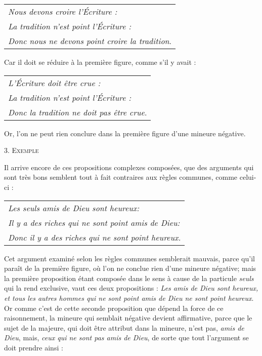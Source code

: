 	\begin{tabularx}{\textwidth}{X}
		\emph{Nous devons croire l'Écriture :} \\
		\emph{La tradition n'est point l'Écriture :} \\
		\emph{Donc nous ne devons point croire la tradition}. \\
	\end{tabularx}

Car il doit se réduire à la première figure, comme s'il y avait :

	\begin{tabularx}{\textwidth}{X}
		\emph{L'Écriture doit être crue :} \\
		\emph{La tradition n'est point l'Écriture :} \\
		\emph{Donc la tradition ne doit pas être crue}. \\
	\end{tabularx}

Or, l'on ne peut rien conclure dans la première figure d'une mineure négative.

\begin{center}{\scshape 3. Exemple}\end{center}

Il arrive encore de ces propositions complexes composées, que des arguments qui sont très bons semblent tout à fait contraires aux règles communes, comme celui-ci :

	\begin{tabularx}{\textwidth}{X}
		\emph{Les seuls amis de Dieu sont heureux:} \\
		\emph{Il y a des riches qui ne sont point amis de Dieu:} \\
		\emph{Donc il y a des riches qui ne sont point heureux.} \\
	\end{tabularx}

Cet argument examiné selon les règles communes semblerait mauvais, parce qu'il paraît de la première figure, où l'on ne conclue rien d'une mineure négative; mais la première proposition étant composée dans le sens à cause de la particule \emph{seuls} qui la rend exclusive, vaut ces deux propositions : \emph{Les amis de Dieu sont heureux, et tous les autres hommes qui ne sont point amis de Dieu ne sont point heureux}. Or comme c'est de cette seconde proposition que dépend la force de ce raisonnement, la mineure qui semblait négative devient affirmative, parce que le sujet de la majeure, qui doit être attribut dans la mineure, n'est pas, \emph{amis de Dieu}, mais, \emph{ceux qui ne sont pas amis de Dieu}, de sorte que tout l'argument se doit prendre ainsi :

